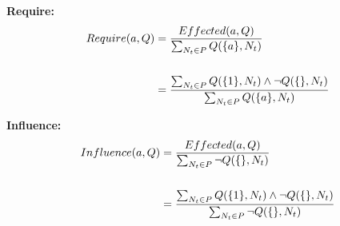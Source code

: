 \textbf{Require:}
\begin{align}
\begin{split}
    Require(a,Q) &= \frac{Effected(a,Q)}{\sum_{N_t \in P} Q(\{a\},N_t){}} \\
\\
                 &= \frac{\sum_{N_t \in P} Q(\{1\},N_t) \land \lnot Q(\{\},N_t){}}{\sum_{N_t \in P} Q(\{a\},N_t){}}
\end{split}
\end{align}

\textbf{Influence:}
\begin{align}
\begin{split}
    Influence(a,Q) &= \frac{Effected(a,Q)}{\sum_{N_t \in P} \lnot Q(\{\},N_t){}} \\
\\
                   &= \frac{\sum_{N_t \in P} Q(\{1\},N_t) \land \lnot Q(\{\},N_t){}}{\sum_{N_t \in P} \lnot Q(\{\},N_t){}}
\end{split}
\end{align}
\\
